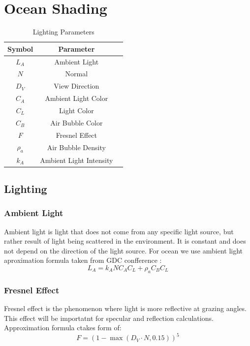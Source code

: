 \section{Ocean Shading}

\begin{table}[H]
    \centering
    \begin{tabular}{|c|c|c|}
        \hline
        \textbf{Symbol} & \textbf{Parameter} \\
        \hline
        $L_A$ & Ambient Light \\
        \hline
        $N$ & Normal \\
        \hline
        $D_V$ & View Direction \\
        \hline
        $C_A$ & Ambient Light Color \\
        \hline
        $C_L$ & Light Color \\
        \hline
        $C_B$ & Air Bubble Color \\
        \hline
        $F$ & Fresnel Effect \\
        \hline
        $\rho_a$ & Air Bubble Density \\
        \hline
        $k_A$ & Ambient Light Intensity \\
        \hline
    \end{tabular}
    \caption{Lighting Parameters}
    \label{table:lighting_parameters}
\end{table}

\subsection{Lighting}

\subsubsection{Ambient Light}
Ambient light is light that does not come from any specific light source, but rather result of light being scattered in the environment. It is constant and does not depend on the direction of the light source.
For ocean we use  ambient light aproximation formula taken from GDC confference \cite{mark2021}:
\begin{equation}
    L_A = k_A N C_A C_L + \rho_a C_B C_L
\end{equation}

\subsubsection{Fresnel Effect}
Fresnel effect is the phenomenon where light is more reflective at grazing angles. This effect will be importatnt for specular and reflection calculations.
Approximation formula ctakes form of:
\begin{equation}
    F = (1 - \max(D_V \cdot N, 0.15))^{5}
\end{equation}

